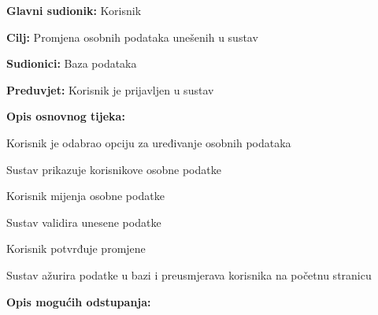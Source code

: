 					\noindent {}
					\begin{packed_item}
	
						\item \textbf{Glavni sudionik: }Korisnik
						\item  \textbf{Cilj:} Promjena osobnih podataka unešenih u sustav
						\item  \textbf{Sudionici:} Baza podataka
						\item  \textbf{Preduvjet:} Korisnik je prijavljen u sustav
						\item  \textbf{Opis osnovnog tijeka:}
					
						\item[] \begin{packed_enum}
							\item Korisnik je odabrao opciju za uređivanje osobnih podataka
							\item Sustav prikazuje korisnikove osobne podatke 
							\item Korisnik mijenja osobne podatke
							\item Sustav validira unesene podatke
							\item Korisnik potvrđuje promjene
							\item Sustav ažurira podatke u bazi i preusmjerava korisnika na početnu stranicu
						\end{packed_enum}

						\eject

						\item  \textbf{Opis mogućih odstupanja:}


\end{packed_item}
